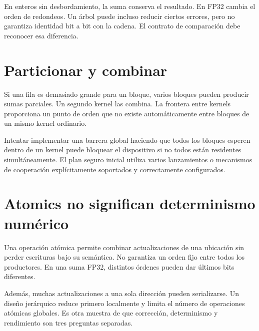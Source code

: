 \documentclass[12pt,a4paper,oneside]{report}
\begin{document}
\begin{center}
\end{center}
En enteros sin desbordamiento, la suma conserva el resultado. En FP32 cambia el orden de redondeos. Un árbol puede incluso reducir ciertos errores, pero no garantiza identidad bit a bit con la cadena. El contrato de comparación debe reconocer esa diferencia.

\section{Particionar y combinar}
Si una fila es demasiado grande para un bloque, varios bloques pueden producir sumas parciales. Un segundo kernel las combina. La frontera entre kernels proporciona un punto de orden que no existe automáticamente entre bloques de un mismo kernel ordinario.

Intentar implementar una barrera global haciendo que todos los bloques esperen dentro de un kernel puede bloquear el dispositivo si no todos están residentes simultáneamente. El plan seguro inicial utiliza varios lanzamientos o mecanismos de cooperación explícitamente soportados y correctamente configurados.

\section{Atomics no significan determinismo numérico}
Una operación atómica permite combinar actualizaciones de una ubicación sin perder escrituras bajo su semántica. No garantiza un orden fijo entre todos los productores. En una suma FP32, distintos órdenes pueden dar últimos bits diferentes.

Además, muchas actualizaciones a una sola dirección pueden serializarse. Un diseño jerárquico reduce primero localmente y limita el número de operaciones atómicas globales. Es otra muestra de que corrección, determinismo y rendimiento son tres preguntas separadas.
\end{document}
